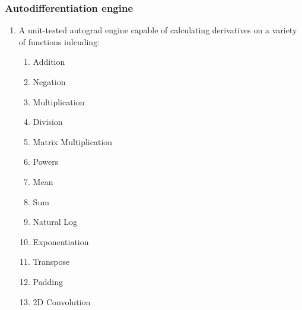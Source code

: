 \documentclass{article}
\begin{document}
    \subsubsection{Autodifferentiation engine}
    \begin{enumerate}
        \item A unit-tested autograd engine capable of calculating derivatives on a variety of functions inlcuding:
        \begin{enumerate}
            \item Addition
            \item Negation
            \item Multiplication
            \item Division
            \item Matrix Multiplication
            \item Powers
            \item Mean
            \item Sum
            \item Natural Log
            \item Exponentiation
            \item Transpose
            \item Padding
            \item 2D Convolution
        \end{enumerate}
    \end{enumerate}
\end{document}
